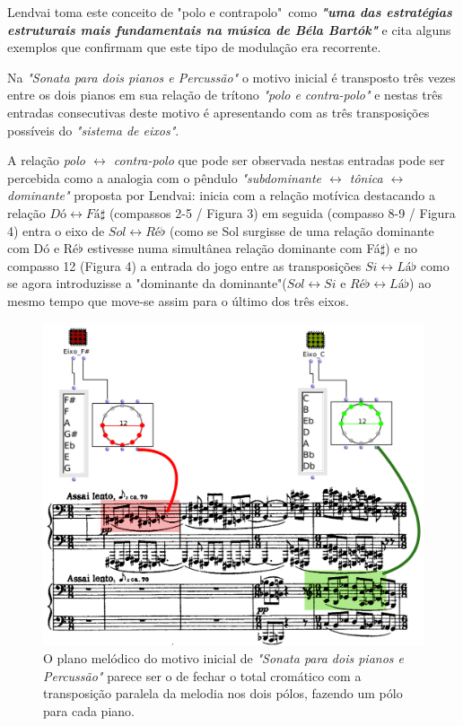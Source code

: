\documentclass[
	12pt,				%
	openright,			%
	twoside,			%
	a4paper,			%
	english,			%
	french,				%
	spanish,			%
	brazil				%
	]{abntex2}
\begin{document}
Lendvai toma este conceito de "polo e contrapolo"\ como \textit{\textbf{"uma das estratégias estruturais mais fundamentais na música de Béla Bartók"}}\cite[p. 04]{lendvai1971bela} e cita alguns exemplos que confirmam que este tipo de modulação era recorrente.

 
Na \textit{"Sonata para dois pianos e Percussão"} o motivo inicial é transposto três vezes entre os dois pianos em sua relação de trítono \textit{"polo e contra-polo"} e nestas três entradas consecutivas deste motivo é apresentando com as três transposições possíveis do \textit{"sistema de eixos"}.

A relação \textit{polo $\leftrightarrow$ contra-polo} que pode ser observada nestas entradas pode ser percebida como a analogia com o pêndulo \textit{"subdominante $\leftrightarrow$ tônica $\leftrightarrow$ dominante"} proposta por Lendvai: inicia com a relação motívica destacando a relação $Dó \leftrightarrow Fá\sharp$ (compassos 2-5 / Figura 3) em seguida (compasso 8-9 / Figura 4) entra o eixo de $Sol \leftrightarrow Ré\flat$ (como se Sol surgisse de uma relação dominante com Dó e Ré$\flat$ estivesse numa simultânea relação dominante com Fá$\sharp$) e no compasso 12 (Figura 4) a entrada do jogo entre as transposições $Si \leftrightarrow Lá\flat$ como se agora introduzisse a "dominante da dominante"($Sol \leftrightarrow Si$ e $Ré\flat \leftrightarrow Lá\flat$) ao mesmo tempo que move-se assim para o último dos três eixos.

\begin{figure}[!h]
	\caption{\label{fig_grafico}O plano melódico do motivo inicial de \textit{"Sonata para dois pianos e Percussão"}  parece ser o de fechar o total cromático com a transposição paralela da melodia nos dois pólos, fazendo um pólo para cada piano. }
	\begin{center}
	    \includegraphics[scale=0.27]{axis/sonata2pianos_dofasus.png}
	\end{center}
\end{figure}
\end{document}
